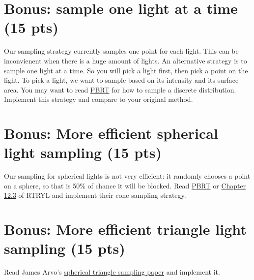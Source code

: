 \section{Bonus: sample one light at a time (15 pts)}
Our sampling strategy currently samples one point for each light. This can be inconvienent when there is a huge amount of lights. An alternative strategy is to sample one light at a time. So you will pick a light first, then pick a point on the light. To pick a light, we want to sample based on its intensity and its surface area. You may want to read \href{https://www.pbr-book.org/3ed-2018/Monte_Carlo_Integration/Sampling_Random_Variables#x1-Example:Piecewise-Constant1DFunctions}{PBRT} for how to sample a discrete distribution. Implement this strategy and compare to your original method.

\section{Bonus: More efficient spherical light sampling (15 pts)}
Our sampling for spherical lights is not very efficient: it randomly chooses a point on a sphere, so that is 50\% of chance it will be blocked. Read \href{https://www.pbr-book.org/3ed-2018/Light_Transport_I_Surface_Reflection/Sampling_Light_Sources#x2-SamplingSpheres}{PBRT} or \href{https://raytracing.github.io/books/RayTracingTheRestOfYourLife.html#cleaninguppdfmanagement/samplingasphereobject}{Chapter 12.3} of RTRYL and implement their cone sampling strategy.

\section{Bonus: More efficient triangle light sampling (15 pts)}
Read James Arvo's \href{https://dl.acm.org/doi/pdf/10.1145/218380.218500}{spherical triangle sampling paper} and implement it.

%
%


